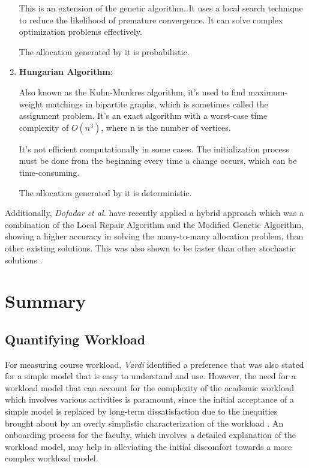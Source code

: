 \begin{enumerate}
        This is an extension of the genetic algorithm. It uses a local search technique to reduce the likelihood of premature convergence.
        It can solve complex optimization problems effectively.

        The allocation generated by it is probabilistic.

  \item \textbf{Hungarian Algorithm}:

        Also known as the Kuhn-Munkres algorithm, it's used to find maximum-weight matchings in bipartite graphs, which is sometimes called the assignment problem.
        It's an exact algorithm with a worst-case time complexity of $O(n^3)$, where n is the number of vertices.

        It's not efficient computationally in some cases. The initialization process must be done from the beginning every time a change occurs, which can be time-consuming.

        The allocation generated by it is deterministic.
\end{enumerate}

Additionally, \textit{Dofadar et al.} have recently applied a hybrid approach which was a combination of the Local Repair Algorithm and the Modified Genetic Algorithm, showing a higher accuracy in solving the many-to-many allocation problem, than other existing solutions. This was also shown to be faster than other stochastic solutions \cite{dofadar2021hybrid}.

\section{Summary}

\subsection{Quantifying Workload}

For measuring course workload, \textit{Vardi} identified a preference that was also stated for a simple model that is easy to understand and use. However, the need for a workload model that can account for the complexity of the academic workload which involves various activities is paramount, since the initial acceptance of a simple model is replaced by long-term dissatisfaction due to the inequities brought about by an overly simplistic characterization of the workload \cite{vardi2009impacts}. An onboarding process for the faculty, which involves a detailed explanation of the workload model, may help in alleviating the initial discomfort towards a more complex workload model.

